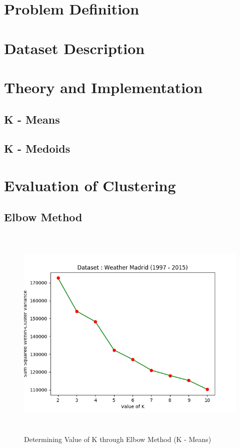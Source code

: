 \documentclass[12pt]{article}
\begin{document}
\maketitle
\thispagestyle{empty}
\clearpage
\newpage

\section{Problem Definition}

\section{Dataset Description}

\section{Theory and Implementation}
\subsection{K - Means}
\subsection{K - Medoids}

\section{Evaluation of Clustering}

\subsection{Elbow Method}

\begin{figure}[H]
	\centering
	\includegraphics[width = \linewidth, height = 10.5cm]{Elbow_Weather.png}
	\caption{Determining Value of K through Elbow Method (K - Means)}
	\label{fig:elbow_weather}
\end{figure}
\end{document}
